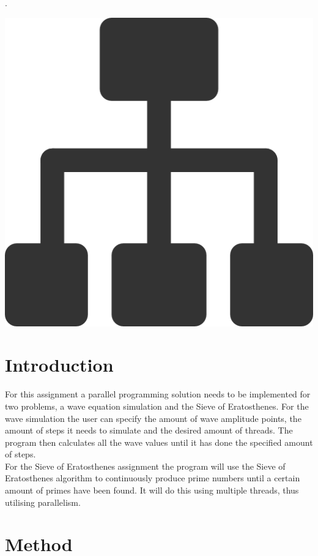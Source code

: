 \documentclass[a4paper,12px]{article}
\begin{document}
\tableofcontents
.\\
\begin{center}
    \includegraphics[width=(\textwidth/5*3)]{parallel_tasks}
\end{center}
\clearpage



\section{Introduction}

For this assignment a parallel programming solution needs to be implemented for
two problems, a wave equation simulation and the Sieve of Eratosthenes. For the
wave simulation the user can specify the amount of wave amplitude points, the
amount of steps it needs to simulate and the desired amount of threads. The
program then calculates all the wave values until it has done the specified
amount of steps.\\
For the Sieve of Eratosthenes assignment the program will use the Sieve of
Eratosthenes algorithm to continuously produce prime numbers until a certain
amount of primes have been found. It will do this using multiple threads, thus
utilising parallelism.

\section{Method}
\end{document}
